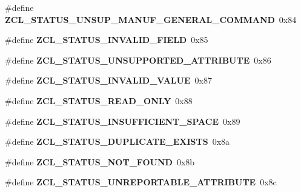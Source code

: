 \begin{DoxyCompactItemize}
\item 
\mbox{\label{group__zcl_ga8fcbd022ad41842b88587e0e3e8a9e04}} 
\#define {\bfseries Z\+C\+L\+\_\+\+S\+T\+A\+T\+U\+S\+\_\+\+U\+N\+S\+U\+P\+\_\+\+M\+A\+N\+U\+F\+\_\+\+G\+E\+N\+E\+R\+A\+L\+\_\+\+C\+O\+M\+M\+A\+ND}~0x84
\item 
\mbox{\label{group__zcl_ga425702cf3f34e360da8c9acff16c40e1}} 
\#define {\bfseries Z\+C\+L\+\_\+\+S\+T\+A\+T\+U\+S\+\_\+\+I\+N\+V\+A\+L\+I\+D\+\_\+\+F\+I\+E\+LD}~0x85
\item 
\mbox{\label{group__zcl_gaa6537cd123db9c7bd0fc1e6dd266a87c}} 
\#define {\bfseries Z\+C\+L\+\_\+\+S\+T\+A\+T\+U\+S\+\_\+\+U\+N\+S\+U\+P\+P\+O\+R\+T\+E\+D\+\_\+\+A\+T\+T\+R\+I\+B\+U\+TE}~0x86
\item 
\mbox{\label{group__zcl_ga3bcdd6dde9bfb34db2f3128bd24c71c0}} 
\#define {\bfseries Z\+C\+L\+\_\+\+S\+T\+A\+T\+U\+S\+\_\+\+I\+N\+V\+A\+L\+I\+D\+\_\+\+V\+A\+L\+UE}~0x87
\item 
\mbox{\label{group__zcl_ga2f7d3dfd56cab3ea207adf13eb749d9b}} 
\#define {\bfseries Z\+C\+L\+\_\+\+S\+T\+A\+T\+U\+S\+\_\+\+R\+E\+A\+D\+\_\+\+O\+N\+LY}~0x88
\item 
\mbox{\label{group__zcl_ga705d2bc0eb7e564ea9da16181f99a0db}} 
\#define {\bfseries Z\+C\+L\+\_\+\+S\+T\+A\+T\+U\+S\+\_\+\+I\+N\+S\+U\+F\+F\+I\+C\+I\+E\+N\+T\+\_\+\+S\+P\+A\+CE}~0x89
\item 
\mbox{\label{group__zcl_ga1546fae37fa7e173f23019ea26756bbe}} 
\#define {\bfseries Z\+C\+L\+\_\+\+S\+T\+A\+T\+U\+S\+\_\+\+D\+U\+P\+L\+I\+C\+A\+T\+E\+\_\+\+E\+X\+I\+S\+TS}~0x8a
\item 
\mbox{\label{group__zcl_gaed9246e31c0878bdf0806ae5f35ffff7}} 
\#define {\bfseries Z\+C\+L\+\_\+\+S\+T\+A\+T\+U\+S\+\_\+\+N\+O\+T\+\_\+\+F\+O\+U\+ND}~0x8b
\item 
\mbox{\label{group__zcl_gacaff54a5d8b766e546eb451cfc803fa4}} 
\#define {\bfseries Z\+C\+L\+\_\+\+S\+T\+A\+T\+U\+S\+\_\+\+U\+N\+R\+E\+P\+O\+R\+T\+A\+B\+L\+E\+\_\+\+A\+T\+T\+R\+I\+B\+U\+TE}~0x8c
\item 
\mbox{\label{group__zcl_ga59b0c5ada36435dc36af717573f91b16}} 

\end{DoxyCompactItemize}
